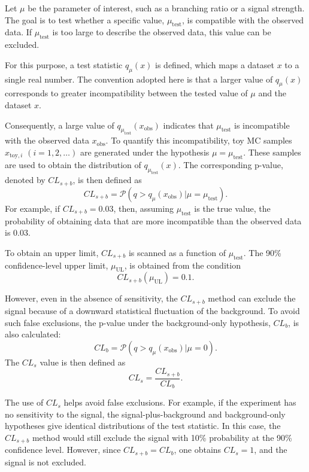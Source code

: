 Let $\mu$ be the parameter of interest, such as a branching ratio or a signal strength.
The goal is to test whether a specific value, $\mu_{\textrm{test}}$, is compatible with the observed data.
If $\mu_{\textrm{test}}$ is too large to describe the observed data, this value can be excluded.

For this purpose, a test statistic $q_{\mu}(x)$ is defined, which maps a dataset $x$ to a single real number.
The convention adopted here is that a larger value of $q_{\mu}(x)$ corresponds to greater incompatibility between the tested value of $\mu$ and the dataset $x$.

Consequently, a large value of $q_{\mu_{\textrm{test}}}(x_{\textrm{obs}})$ indicates that $\mu_{\textrm{test}}$ is incompatible with the observed data $x_{\textrm{obs}}$.
To quantify this incompatibility, toy MC samples $x_{\textrm{toy},i}$ $(i=1,2,\ldots)$ are generated under the hypothesis $\mu=\mu_{\textrm{test}}$.
These samples are used to obtain the distribution of $q_{\mu_{\textrm{test}}}(x)$.
The corresponding p-value, denoted by $CL_{s+b}$, is then defined as
\begin{equation}
    CL_{s+b}=\mathcal{P}(q>q_\mu(x_{\textrm{obs}})|\mu=\mu_{\textrm{test}}).
\end{equation}
For example, if $CL_{s+b}=0.03$, then, assuming $\mu_{\textrm{test}}$ is the true value, the probability of obtaining data that are more incompatible than the observed data is 0.03.

To obtain an upper limit, $CL_{s+b}$ is scanned as a function of $\mu_{\textrm{test}}$.
The 90\% confidence-level upper limit, $\mu_{\textrm{UL}}$, is obtained from the condition
\begin{equation}
    CL_{s+b}(\mu_{\textrm{UL}}) = 0.1.
\end{equation}

However, even in the absence of sensitivity, the $CL_{s+b}$ method can exclude the signal because of a downward statistical fluctuation of the background.
To avoid such false exclusions, the p-value under the background-only hypothesis, $CL_{b}$, is also calculated:
\begin{equation}
    CL_{b}=\mathcal{P}(q>q_\mu(x_{\textrm{obs}})|\mu=0).
\end{equation}
The $CL_{s}$ value is then defined as
\begin{equation}
    CL_{s}=\frac{CL_{s+b}}{CL_{b}}.
\end{equation}

The use of $CL_{s}$ helps avoid false exclusions.
For example, if the experiment has no sensitivity to the signal, the signal-plus-background and background-only hypotheses give identical distributions of the test statistic.
In this case, the $CL_{s+b}$ method would still exclude the signal with 10\% probability at the 90\% confidence level.
However, since $CL_{s+b}=CL_{b}$, one obtains $CL_{s}=1$, and the signal is not excluded.


